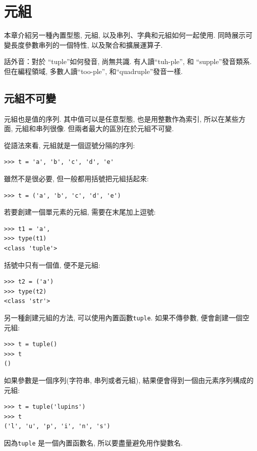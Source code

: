 \documentclass[10pt]{book}
\begin{document}
\chapter{元組}
\label{tuplechap}

本章介紹另一種內置型態, 元組, 以及串列、字典和元組如何一起使用. 
同時展示可變長度參數串列的一個特性, 以及聚合和擴展運算子. 

話外音：對於 ``tuple''如何發音, 尚無共識. 有人讀``tuh-ple'', 
和 ``supple''發音類系. 
但在編程領域, 多數人讀``too-ple'', 和``quadruple''發音一樣. 


\section{元組不可變}

元組也是值的序列. 其中值可以是任意型態, 也是用整數作為索引, 
所以在某些方面, 元組和串列很像. 
但兩者最大的區別在於元組不可變. 

從語法來看, 元組就是一個逗號分隔的序列:

\begin{verbatim}
>>> t = 'a', 'b', 'c', 'd', 'e'
\end{verbatim}
%
雖然不是很必要, 但一般都用括號把元組括起來:

\begin{verbatim}
>>> t = ('a', 'b', 'c', 'd', 'e')
\end{verbatim}
%
若要創建一個單元素的元組, 需要在末尾加上逗號:

\begin{verbatim}
>>> t1 = 'a',
>>> type(t1)
<class 'tuple'>
\end{verbatim}
%
括號中只有一個值, 便不是元組:

\begin{verbatim}
>>> t2 = ('a')
>>> type(t2)
<class 'str'>
\end{verbatim}
%
另一種創建元組的方法, 可以使用內置函數{\tt tuple}. 
如果不傳參數, 便會創建一個空元組:

\begin{verbatim}
>>> t = tuple()
>>> t
()
\end{verbatim}
%
如果參數是一個序列(字符串, 串列或者元組), 
結果便會得到一個由元素序列構成的元組:

\begin{verbatim}
>>> t = tuple('lupins')
>>> t
('l', 'u', 'p', 'i', 'n', 's')
\end{verbatim}
%
因為{\tt tuple} 是一個內置函數名, 
所以要盡量避免用作變數名. 
\end{document}
